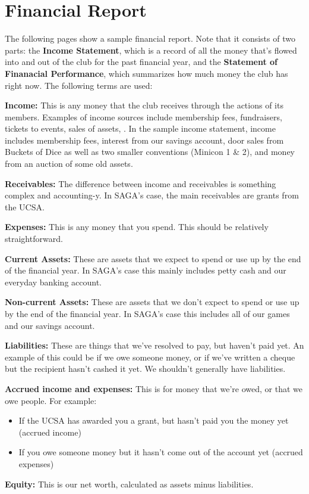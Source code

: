 \section{Financial Report}

The following pages show a sample financial report. Note that it consists of two parts: the \textbf{Income Statement}, which is a record of all the money that's flowed into and out of the club for the past financial year, and the \textbf{Statement of Finanacial Performance}, which summarizes how much money the club has right now. The following terms are used:

\textbf{Income:} This is any money that the club receives through the actions of its members. Examples of income sources include membership fees, fundraisers, tickets to events, sales of assets, \etc. In the sample income statement, income includes membership fees, interest from our savings account, door sales from Buckets of Dice as well as two smaller conventions (Minicon 1 \& 2), and money from an auction of some old assets.

\textbf{Receivables:} The difference between income and receivables is something complex and accounting-y. In SAGA's case, the main receivables are grants from the UCSA.

\textbf{Expenses:} This is any money that you spend. This should be relatively straightforward.

\textbf{Current Assets:} These are assets that we expect to spend or use up by the end of the financial year. In SAGA's case this mainly includes petty cash and our everyday banking account.

\textbf{Non-current Assets:} These are assets that we don't expect to spend or use up by the end of the financial year. In SAGA's case this includes all of our games and our savings account.

\textbf{Liabilities:} These are things that we've resolved to pay, but haven't paid yet. An example of this could be if we owe someone money, or if we've written a cheque but the recipient hasn't cashed it yet. We shouldn't generally have liabilities.

\textbf{Accrued income and expenses:} This is for money that we're owed, or that we owe people. For example:

\begin{itemize}
  \item If the UCSA has awarded you a grant, but hasn't paid you the money yet (accrued income)
  \item If you owe someone money but it hasn't come out of the account yet (accrued expenses)
\end{itemize}

\textbf{Equity:} This is our net worth, calculated as assets minus liabilities.


